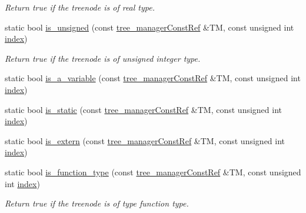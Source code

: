 \begin{DoxyCompactItemize}
\begin{DoxyCompactList}\small\item\em Return true if the treenode is of real type. \end{DoxyCompactList}\item 
static bool \hyperlink{classtree__helper_ad9f5cee17052b3d02aa3b4a6bd87975d}{is\+\_\+unsigned} (const \hyperlink{tree__manager_8hpp_a792e3f1f892d7d997a8d8a4a12e39346}{tree\+\_\+manager\+Const\+Ref} \&TM, const unsigned int \hyperlink{tutorial__pact__2019_2Introduction_2third_2include_2Keccak_8h_a028c9bdc8344cca38ab522a337074797}{index})
\begin{DoxyCompactList}\small\item\em Return true if the treenode is of unsigned integer type. \end{DoxyCompactList}\item 
static bool \hyperlink{classtree__helper_a4d6b6fc3da723a3aad8b884f9dd7ad9d}{is\+\_\+a\+\_\+variable} (const \hyperlink{tree__manager_8hpp_a792e3f1f892d7d997a8d8a4a12e39346}{tree\+\_\+manager\+Const\+Ref} \&TM, const unsigned int \hyperlink{tutorial__pact__2019_2Introduction_2third_2include_2Keccak_8h_a028c9bdc8344cca38ab522a337074797}{index})
\item 
static bool \hyperlink{classtree__helper_a962b5e392c5e3b7c9f461c4460ee6f8b}{is\+\_\+static} (const \hyperlink{tree__manager_8hpp_a792e3f1f892d7d997a8d8a4a12e39346}{tree\+\_\+manager\+Const\+Ref} \&TM, const unsigned int \hyperlink{tutorial__pact__2019_2Introduction_2third_2include_2Keccak_8h_a028c9bdc8344cca38ab522a337074797}{index})
\item 
static bool \hyperlink{classtree__helper_aa13e4e539150602fcb62d284869db494}{is\+\_\+extern} (const \hyperlink{tree__manager_8hpp_a792e3f1f892d7d997a8d8a4a12e39346}{tree\+\_\+manager\+Const\+Ref} \&TM, const unsigned int \hyperlink{tutorial__pact__2019_2Introduction_2third_2include_2Keccak_8h_a028c9bdc8344cca38ab522a337074797}{index})
\item 
static bool \hyperlink{classtree__helper_aaee6527f97763e85b8cf0446e92f562c}{is\+\_\+function\+\_\+type} (const \hyperlink{tree__manager_8hpp_a792e3f1f892d7d997a8d8a4a12e39346}{tree\+\_\+manager\+Const\+Ref} \&TM, const unsigned int \hyperlink{tutorial__pact__2019_2Introduction_2third_2include_2Keccak_8h_a028c9bdc8344cca38ab522a337074797}{index})
\begin{DoxyCompactList}\small\item\em Return true if the treenode is of type function type. \end{DoxyCompactList}\item 

\end{DoxyCompactItemize}
